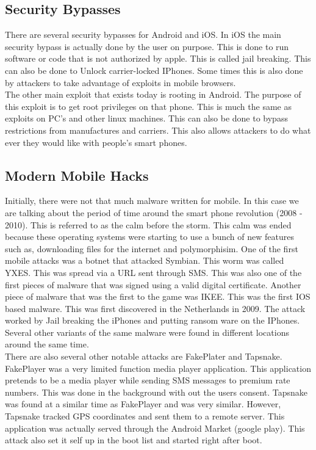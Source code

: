 \documentclass[letterpaper, onecolumn,10pt]{IEEEtran}
\begin{document}
		     \subsection{Security Bypasses}
		     There are several security bypasses for Android and iOS. In iOS the main security bypass is actually done by the user on purpose. This is done to run software or code that is not authorized by apple. This is called jail breaking. This can also be done to Unlock carrier-locked IPhones. Some times this is also done by attackers to take advantage of exploits in mobile browsers.\\
		     
		     The other main exploit that exists today is rooting in Android. The purpose of this exploit is to get root privileges on that phone. This is much the same as exploits on PC's and other linux machines. This can also be done to bypass restrictions from manufactures and carriers. This also allows attackers to do what ever they would like with people's smart phones.\\
		     
		     \subsection{Modern Mobile Hacks}
		     Initially, there were not that much malware written for mobile. In this case we are talking about the period of time around the smart phone revolution (2008 - 2010). This is referred to as the calm before the storm. This calm was ended because these operating systems were starting to use a bunch of new features such as, downloading files for the internet and polymorphisim. One of the first mobile attacks was a botnet that attacked Symbian. This worm was called YXES. This was spread via a URL sent through SMS. This was also one of the first pieces of malware that was signed using a valid digital certificate. Another piece of malware that was the first to the game was IKEE. This was the first IOS based malware. This was first discovered in the Netherlands in 2009. The attack worked by Jail breaking the iPhones and putting ransom ware on the IPhones. Several other variants of the same malware were found in different locations around the same time.\\
		     
		     There are also several other notable attacks are FakePlater and Tapsnake. FakePlayer was a very limited function media player application. This application pretends to be a media player while sending SMS messages to premium rate numbers. This was done in the background with out the users consent. Tapsnake was found at a similar time as FakePlayer and was very similar. However, Tapsnake tracked GPS coordinates and sent them to a remote server. This application was actually served through the Android Market (google play). This attack also set it self up in the boot list and started right after boot.\\
		     
\end{document}
